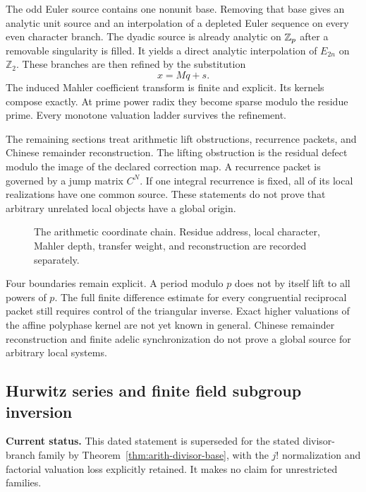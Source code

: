 The odd Euler source contains one nonunit base. Removing that base gives an analytic unit source and an interpolation of a depleted Euler sequence on every even character branch. The dyadic source is already analytic on \(\mathbb Z_p\) after a removable singularity is filled. It yields a direct analytic interpolation of \(E_{2n}\) on \(\mathbb Z_2\). These branches are then refined by the substitution
\[
x=Mq+s.
\]
The induced Mahler coefficient transform is finite and explicit. Its kernels compose exactly. At prime power radix they become sparse modulo the residue prime. Every monotone valuation ladder survives the refinement.

The remaining sections treat arithmetic lift obstructions, recurrence packets, and Chinese remainder reconstruction. The lifting obstruction is the residual defect modulo the image of the declared correction map. A recurrence packet is governed by a jump matrix \(C^N\). If one integral recurrence is fixed, all of its local realizations have one common source. These statements do not prove that arbitrary unrelated local objects have a global origin.

\begin{figure}[t]
\centering
{}
\caption{The arithmetic coordinate chain. Residue address, local character, Mahler depth, transfer weight, and reconstruction are recorded separately.}
\label{hist:fig:architecture}
\end{figure}

Four boundaries remain explicit. A period modulo \(p\) does not by itself lift to all powers of \(p\). The full finite difference estimate for every congruential reciprocal packet still requires control of the triangular inverse. Exact higher valuations of the affine polyphase kernel are not yet known in general. Chinese remainder reconstruction and finite adelic synchronization do not prove a global source for arbitrary local systems.
\subsection{Hurwitz series and finite field subgroup inversion}\label{hist:sec:hurwitz}
\par\smallskip\noindent\textbf{Current status.} This dated statement is superseded for the stated divisor-branch family by Theorem~\ref{thm:arith-divisor-base}, with the $j!$ normalization and factorial valuation loss explicitly retained. It makes no claim for unrestricted families.\par

